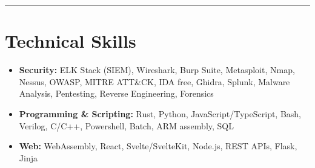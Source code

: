 \documentclass[a4paper,10pt]{article}
\begin{document}
\vspace{5pt}\hrule

\section*{Technical Skills}
\vspace{-8pt}
\begin{itemize}
    \item \textbf{Security:} ELK Stack (SIEM), Wireshark, Burp Suite, Metasploit, Nmap, Nessus, OWASP, MITRE ATT\&CK, IDA free, Ghidra, Splunk, Malware Analysis, Pentesting, Reverse Engineering, Forensics
    \item \textbf{Programming \& Scripting:} Rust, Python, JavaScript/TypeScript, Bash, Verilog, C/C++, Powershell, Batch, ARM assembly, SQL
    \item \textbf{Web:} WebAssembly, React, Svelte/SvelteKit, Node.js, REST APIs, Flask, Jinja
\end{itemize}
\end{document}
